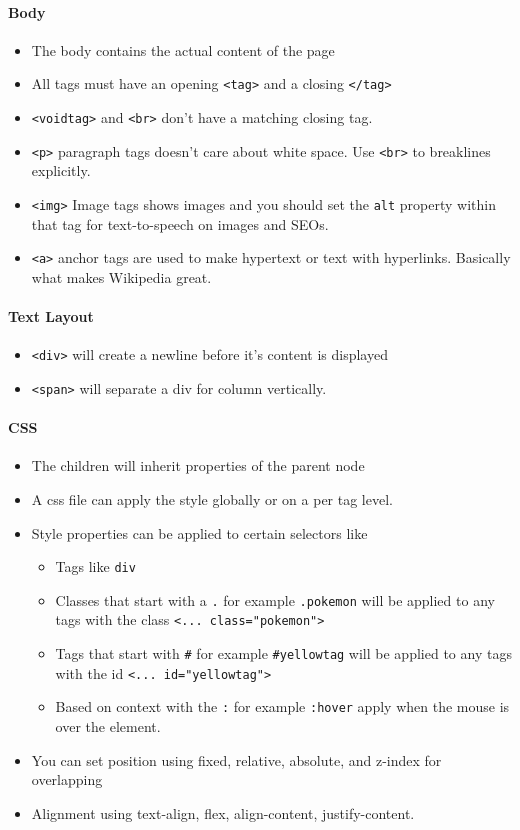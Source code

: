 \documentclass[../CMPUT-404-Notes.tex]{subfiles}
\begin{document}
\paragraph{Body}
\begin{itemize}
  \item The body contains the actual content of the page
  \item All tags must have an opening \texttt{<tag>} and a closing \texttt{</tag>}
  \item \texttt{<voidtag>} and \texttt{<br>} don't have a matching closing tag.
  \item \texttt{<p>} paragraph tags doesn't care about white space. Use \texttt{<br>} to breaklines explicitly. 
  \item \texttt{<img>} Image tags shows images and you should set the \texttt{alt} property within that tag for text-to-speech on images and SEOs.
  \item \texttt{<a>} anchor tags are used to make hypertext or text with hyperlinks. Basically what makes Wikipedia great.
\end{itemize}
\paragraph{Text Layout}
\begin{itemize}
  \item \texttt{<div>} will create a newline before it's content is displayed
  \item \texttt{<span>} will separate a div for column vertically. 
\end{itemize}
\paragraph{CSS}
\begin{itemize}
  \item The children will inherit properties of the parent node
  \item A css file can apply the style globally or on a per tag level. 
  \item Style properties can be applied to certain selectors like 
  \begin{itemize}
    \item Tags like \texttt{div}
    \item Classes that start with a \texttt{.} for example \texttt{.pokemon} will be applied to any tags with the class \texttt{<... class="pokemon">}
    \item Tags that start with \texttt{\#} for example \texttt{#yellowtag} will be applied to any tags with the id \texttt{<... id="yellowtag">} 
    \item Based on context with the \texttt{:} for example \texttt{:hover} apply when the mouse is over the element.
  \end{itemize}
  \item You can set position using fixed, relative, absolute, and z-index for overlapping
  \item Alignment using text-align, flex, align-content, justify-content.
\end{itemize}
\end{document}
